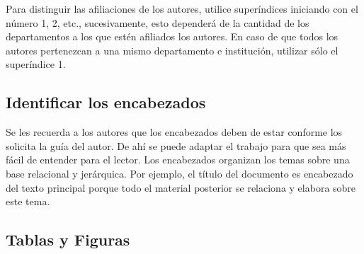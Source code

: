         Para distinguir las afiliaciones de los autores, utilice superíndices iniciando con el número 1, 2, etc., sucesivamente, esto dependerá de la cantidad de los departamentos a los que estén afiliados los autores. En caso de que todos los autores pertenezcan a una mismo departamento e institución, utilizar sólo el superíndice 1. 
    
        \subsection{Identificar los encabezados}
    
        Se les recuerda a los autores que los encabezados deben de estar conforme los solicita la guía del autor. De ahí se puede adaptar el trabajo para que sea más fácil de entender para el lector.
        Los encabezados organizan los temas sobre una base relacional y jerárquica. Por ejemplo, el título del documento es encabezado del texto principal porque todo el material posterior se relaciona y elabora sobre este tema.
        
    \subsection{Tablas y Figuras}
    
